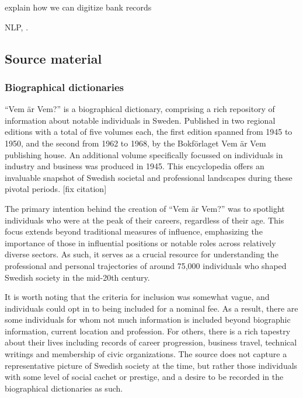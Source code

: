 \documentclass[
]{article}
\begin{document}
\textcite{amujala2023digitization} explain how we can digitize bank
records

NLP, \textcite{eichengreen2021gold}.

\hypertarget{source-material}{%
\subsection{Source material}\label{source-material}}

\hypertarget{biographical-dictionaries}{%
\subsubsection{Biographical
dictionaries}\label{biographical-dictionaries}}

``Vem är Vem?'' is a biographical dictionary, comprising a rich
repository of information about notable individuals in Sweden. Published
in two regional editions with a total of five volumes each, the first
edition spanned from 1945 to 1950, and the second from 1962 to 1968, by
the Bokförlaget Vem är Vem publishing house. An additional volume
specifically focussed on individuals in industry and business was
produced in 1945. This encyclopedia offers an invaluable snapshot of
Swedish societal and professional landscapes during these pivotal
periods. {[}fix citation{]}

The primary intention behind the creation of ``Vem är Vem?'' was to
spotlight individuals who were at the peak of their careers, regardless
of their age. This focus extends beyond traditional measures of
influence, emphasizing the importance of those in influential positions
or notable roles across relatively diverse sectors. As such, it serves
as a crucial resource for understanding the professional and personal
trajectories of around 75,000 individuals who shaped Swedish society in
the mid-20th century.

It is worth noting that the criteria for inclusion was somewhat vague,
and individuals could opt in to being included for a nominal fee. As a
result, there are some individuals for whom not much information is
included beyond biographic information, current location and profession.
For others, there is a rich tapestry about their lives including records
of career progression, business travel, technical writings and
membership of civic organizations. The source does not capture a
representative picture of Swedish society at the time, but rather those
individuals with some level of social cachet or prestige, and a desire
to be recorded in the biographical dictionaries as such.
\end{document}
